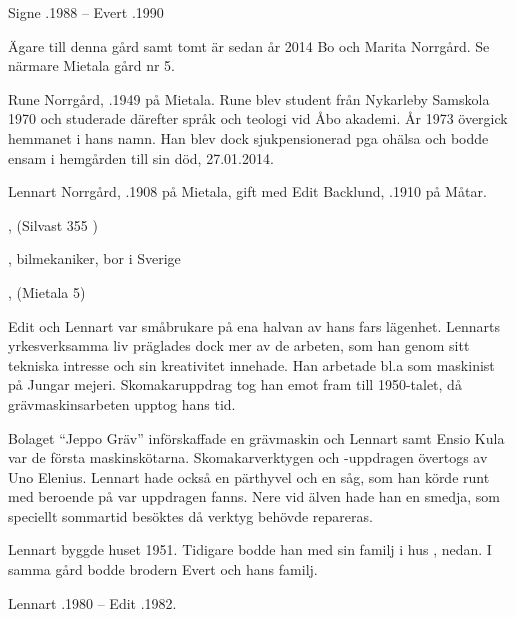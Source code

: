 Signe .1988	--	Evert .1990




Ägare till denna gård samt tomt är sedan år 2014 Bo och Marita Norrgård. Se närmare Mietala gård nr 5.


Rune Norrgård, .1949 på Mietala. Rune blev student från Nykarleby Samskola 1970 och studerade därefter språk och teologi vid Åbo akademi. År 1973 övergick hemmanet i hans namn. Han blev dock sjukpensionerad pga ohälsa och bodde ensam i hemgården till sin död, 27.01.2014.

Lennart Norrgård, .1908 på Mietala, gift med Edit Backlund,	.1910 på Måtar.
\begin{jhchildren}
  \item {}, (Silvast 355 )
  \item {}, bilmekaniker, bor i Sverige
  \item {}, (Mietala 5)
  \item {}
\end{jhchildren}
Edit och Lennart var småbrukare på ena halvan av hans fars lägenhet. Lennarts yrkesverksamma liv präglades dock mer av de arbeten, som han genom sitt tekniska intresse och sin kreativitet innehade. Han arbetade bl.a som maskinist på Jungar mejeri. Skomakaruppdrag tog han emot fram till 1950-talet, då grävmaskinsarbeten upptog hans tid.

Bolaget ``Jeppo Gräv'' införskaffade en grävmaskin och Lennart samt Ensio Kula var de första maskinskötarna. Skomakarverktygen och -uppdragen övertogs av Uno Elenius. Lennart hade också en pärthyvel och en såg, som han körde runt med beroende på var uppdragen fanns. Nere vid älven hade han en smedja, som speciellt sommartid besöktes då verktyg behövde repareras.

Lennart byggde huset 1951. Tidigare bodde han med sin familj i hus , nedan. I samma gård bodde brodern Evert och hans familj.

Lennart .1980  --  Edit .1982.



